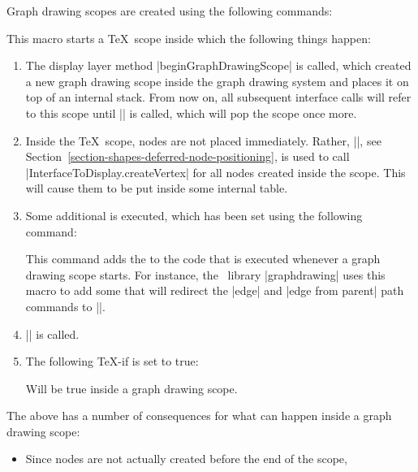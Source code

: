 Graph drawing scopes are created using the following commands:

\begin{command}{\pgfgdbeginscope}
    This macro starts a \TeX\ scope inside which the following things happen:
    \begin{enumerate}
        \item The display layer method |beginGraphDrawingScope| is called,
            which created a new graph drawing scope inside the graph drawing
            system and places it on top of an internal stack. From now on, all
            subsequent interface calls will refer to this scope until
            |\pgfgdendscope| is called, which will pop the scope once more.
        \item Inside the \TeX\ scope, nodes are not placed immediately. Rather,
            |\pgfpositionnodelater|, see
            Section~\ref{section-shapes-deferred-node-positioning}, is used to
            call |InterfaceToDisplay.createVertex| for all nodes created inside
            the scope. This will cause them to be put inside some internal
            table.
        \item Some additional  is executed, which has been set using
            the following command:
            \begin{command}{\pgfgdaddspecificationhook{}}
                This command adds the  to the code that is executed
                whenever a graph drawing scope starts. For instance, the
                \tikzname\ library |graphdrawing| uses this macro to add some
                 that will redirect the |edge| and
                |edge from parent| path commands to |\pgfgdedge|.
            \end{command}
        \item |\pgftransformreset| is called.
        \item The following \TeX-if is set to true:
            {
                \let\ifpgfgdgraphdrawingscopeactive=\relax
                \begin{textoken}{\ifpgfgdgraphdrawingscopeactive}
                    Will be true inside a graph drawing scope.
                \end{textoken}
            }
    \end{enumerate}
    The above has a number of consequences for what can happen inside a graph
    drawing scope:
    \begin{itemize}
        \item Since nodes are not actually created before the end of the scope,

\end{itemize}
\end{command}
